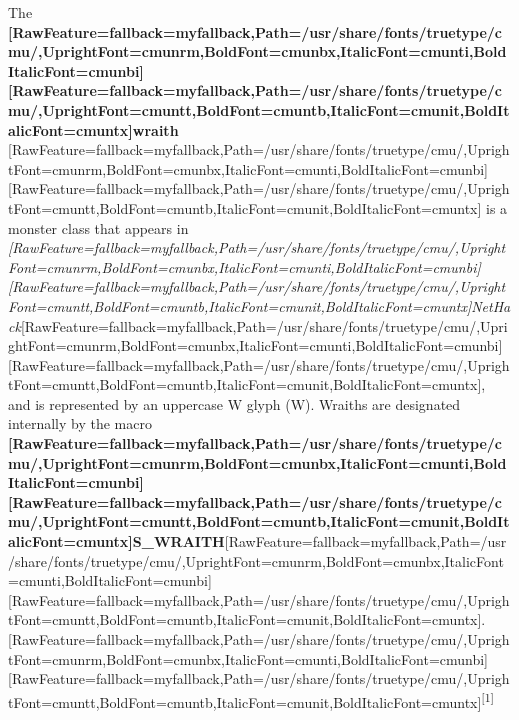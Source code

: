 The {\bfseries \allowbreak{}\setmainfont{cmunbx.ttf}[RawFeature={fallback=myfallback},Path=/usr/share/fonts/truetype/cmu/,UprightFont=cmunrm,BoldFont=cmunbx,ItalicFont=cmunti,BoldItalicFont=cmunbi]\setmonofont{cmunbx.ttf}[RawFeature={fallback=myfallback},Path=/usr/share/fonts/truetype/cmu/,UprightFont=cmuntt,BoldFont=cmuntb,ItalicFont=cmunit,BoldItalicFont=cmuntx]\bfseries wraith}{$\text{ }$}\allowbreak{}\setmainfont{cmunrm.ttf}[RawFeature={fallback=myfallback},Path=/usr/share/fonts/truetype/cmu/,UprightFont=cmunrm,BoldFont=cmunbx,ItalicFont=cmunti,BoldItalicFont=cmunbi]\setmonofont{cmunrm.ttf}[RawFeature={fallback=myfallback},Path=/usr/share/fonts/truetype/cmu/,UprightFont=cmuntt,BoldFont=cmuntb,ItalicFont=cmunit,BoldItalicFont=cmuntx] is a monster class\footnotemark[2] that appears in {\itshape \allowbreak{}\setmainfont{cmunti.ttf}[RawFeature={fallback=myfallback},Path=/usr/share/fonts/truetype/cmu/,UprightFont=cmunrm,BoldFont=cmunbx,ItalicFont=cmunti,BoldItalicFont=cmunbi]\setmonofont{cmunti.ttf}[RawFeature={fallback=myfallback},Path=/usr/share/fonts/truetype/cmu/,UprightFont=cmuntt,BoldFont=cmuntb,ItalicFont=cmunit,BoldItalicFont=cmuntx]\itshape NetHack\footnotemark[3]}\allowbreak{}\setmainfont{cmunrm.ttf}[RawFeature={fallback=myfallback},Path=/usr/share/fonts/truetype/cmu/,UprightFont=cmunrm,BoldFont=cmunbx,ItalicFont=cmunti,BoldItalicFont=cmunbi]\setmonofont{cmunrm.ttf}[RawFeature={fallback=myfallback},Path=/usr/share/fonts/truetype/cmu/,UprightFont=cmuntt,BoldFont=cmuntb,ItalicFont=cmunit,BoldItalicFont=cmuntx], and is represented by an uppercase W\footnotemark[4] glyph (W). Wraiths are designated internally by the macro {\bfseries \allowbreak{}\setmainfont{cmunbx.ttf}[RawFeature={fallback=myfallback},Path=/usr/share/fonts/truetype/cmu/,UprightFont=cmunrm,BoldFont=cmunbx,ItalicFont=cmunti,BoldItalicFont=cmunbi]\setmonofont{cmunbx.ttf}[RawFeature={fallback=myfallback},Path=/usr/share/fonts/truetype/cmu/,UprightFont=cmuntt,BoldFont=cmuntb,ItalicFont=cmunit,BoldItalicFont=cmuntx]\bfseries S\_WRAITH}\allowbreak{}\setmainfont{cmunrm.ttf}[RawFeature={fallback=myfallback},Path=/usr/share/fonts/truetype/cmu/,UprightFont=cmunrm,BoldFont=cmunbx,ItalicFont=cmunti,BoldItalicFont=cmunbi]\setmonofont{cmunrm.ttf}[RawFeature={fallback=myfallback},Path=/usr/share/fonts/truetype/cmu/,UprightFont=cmuntt,BoldFont=cmuntb,ItalicFont=cmunit,BoldItalicFont=cmuntx].\allowbreak{}\setmainfont{cmunrm.ttf}[RawFeature={fallback=myfallback},Path=/usr/share/fonts/truetype/cmu/,UprightFont=cmunrm,BoldFont=cmunbx,ItalicFont=cmunti,BoldItalicFont=cmunbi]\setmonofont{cmunrm.ttf}[RawFeature={fallback=myfallback},Path=/usr/share/fonts/truetype/cmu/,UprightFont=cmuntt,BoldFont=cmuntb,ItalicFont=cmunit,BoldItalicFont=cmuntx]\textsuperscript{{$\text{[}$}1{$\text{]}$}}


